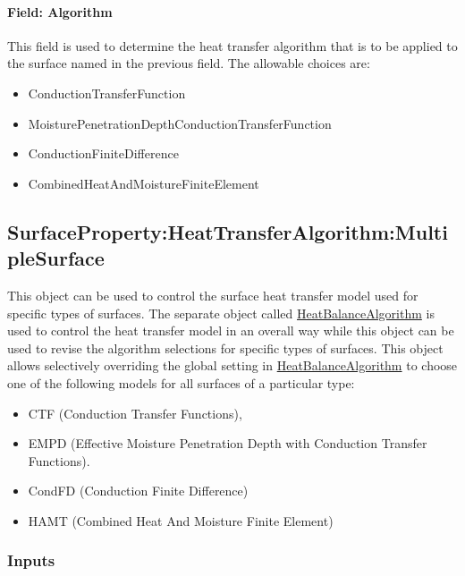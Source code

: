 \paragraph{Field: Algorithm}\label{field-algorithm}

This field is used to determine the heat transfer algorithm that is to be applied to the surface named in the previous field. The allowable choices are:

\begin{itemize}
\item
  ConductionTransferFunction
\item
  MoisturePenetrationDepthConductionTransferFunction
\item
  ConductionFiniteDifference
\item
  CombinedHeatAndMoistureFiniteElement
\end{itemize}

\subsection{SurfaceProperty:HeatTransferAlgorithm:MultipleSurface}\label{surfacepropertyheattransferalgorithmmultiplesurface}

This object can be used to control the surface heat transfer model used for specific types of surfaces. The separate object called \hyperref[heatbalancealgorithm]{HeatBalanceAlgorithm} is used to control the heat transfer model in an overall way while this object can be used to revise the algorithm selections for specific types of surfaces. This object allows selectively overriding the global setting in \hyperref[heatbalancealgorithm]{HeatBalanceAlgorithm} to choose one of the following models for all surfaces of a particular type:

\begin{itemize}
\item
  CTF (Conduction Transfer Functions),
\item
  EMPD (Effective Moisture Penetration Depth with Conduction Transfer Functions).
\item
  CondFD (Conduction Finite Difference)
\item
  HAMT (Combined Heat And Moisture Finite Element)
\end{itemize}

\subsubsection{Inputs}\label{inputs-1-000}

